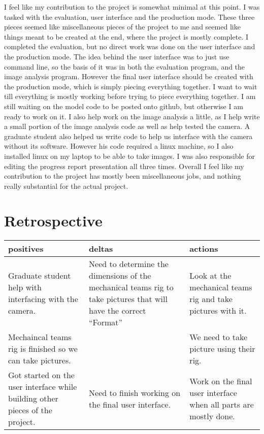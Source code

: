 \documentclass[onecolumn, draftclsnofoot,10pt, compsoc]{IEEEtran}
\begin{document}
I feel like my contribution to the project is somewhat minimal at this point. I was tasked with the evaluation, user interface and the production mode. These three pieces seemed like miscellaneous pieces of the project to me and seemed like things meant to be created at the end, where the project is mostly complete. I completed the evaluation, but no direct work was done on the user interface and the production mode. The idea behind the user interface was to just use command line, so the basis of it was in both the evaluation program, and the image analysis program. However the final user interface should be created with the production mode, which is simply piecing everything together. I want to wait till everything is mostly working before trying to piece everything together. I am still waiting on the model code to be posted onto github, but otherwise I am ready to work on it. I also help work on the image analysis a little, as I help write a small portion of the image analysis code as well as help tested the camera. A graduate student also helped us write code to help us interface with the camera without its software. However his code required a linux machine, so I also installed linux on my laptop to be able to take images. I was also responsible for editing the progress report presentation all three times. Overall I feel like my contribution to the project has mostly been miscellaneous jobs, and nothing really substantial for the actual project.

\section{Retrospective }

\begin{tabular}{|p{5cm} | p{5cm} | p{5cm}|} 
	\hline
	positives  & deltas  & actions \\ [0.5ex] 
	\hline\hline
	Graduate student help with interfacing with the camera. & Need to determine the dimensions of the mechanical teams rig to take pictures that will have the correct “Format” & Look at the mechanical teams rig and take pictures with it.\\
	\hline
	Mechaincal teams rig is finished so we can take pictures. & & We need to take picture using their rig. \\
	\hline
	Got started on the user interface while building other pieces of the project. & Need to finish working on the final user interface. & Work on the final user interface when all parts are mostly done. \\
	\hline  

	
\end{tabular}




\end{document}
